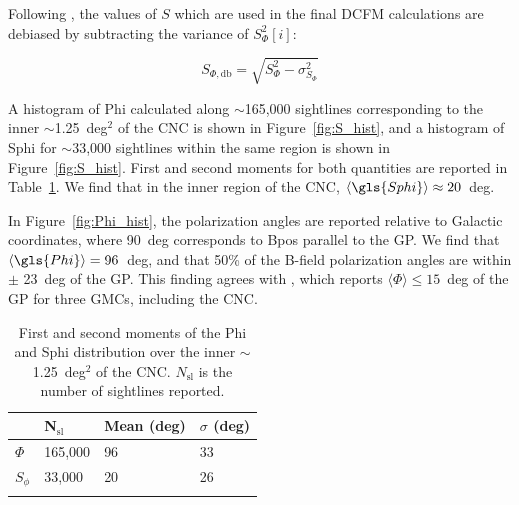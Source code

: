 Following \citet{fissel2016balloon}, the values of $S$ which are used in the final DCFM calculations are debiased by subtracting the variance of $S^{2}_{\Phi}[i]$:

\begin{equation}\label{eq:ADF}
  S_{\Phi,\mathrm{db}} = \sqrt{S_{\Phi}^{2} - \sigma^{2}_{S_\Phi}}
\end{equation}

A histogram of \gls{Phi} calculated along $\sim$165,000 sightlines corresponding to the inner $\sim$1.25~deg$^{2}$ of the CNC is shown in Figure~\ref{fig:S_hist}, and a histogram of \gls{Sphi} for $\sim$33,000 sightlines within the same region is shown in Figure~\ref{fig:S_hist}. First and second moments for both quantities are reported in Table~\ref{table:S_and_Phi}. We find that in the inner region of the CNC, $\langle \gls{Sphi} \rangle \approx 20$~deg.

In Figure~\ref{fig:Phi_hist}, the polarization angles are reported relative to Galactic coordinates, where 90~deg corresponds to \gls{Bpos} parallel to the GP\@. We find that $\langle \gls{Phi} \rangle = 96$~deg, and that 50\% of the B-field polarization angles are within $\pm$ 23~deg of the GP\@. This finding agrees with \citet{li2006results}, which reports $\langle \Phi \rangle \leq 15$~deg of the GP for three GMCs, including the CNC\@.

\begin{table}[!htbp]
\centering
\begin{tabular}{@{}llll@{}}
\dtoprule{}
 & N$_{\mathrm{sl}}$ & Mean (deg) & $\sigma$ (deg) \\ \midrule
$\Phi$  & 165,000 & 96 & 33 \\
$S_{\phi}$  & 33,000 & 20 & 26 \\ \dbottomrule{}
\\
\end{tabular}
\caption[First and second moments of the  and  distribution over the inner  of the CNC.]{First and second moments of the \gls{Phi} and \gls{Sphi} distribution over the inner $\sim$1.25~deg$^{2}$ of the CNC\@. $N_{\mathrm{sl}}$ is the number of sightlines reported.}
\label{table:S_and_Phi}
\end{table}

